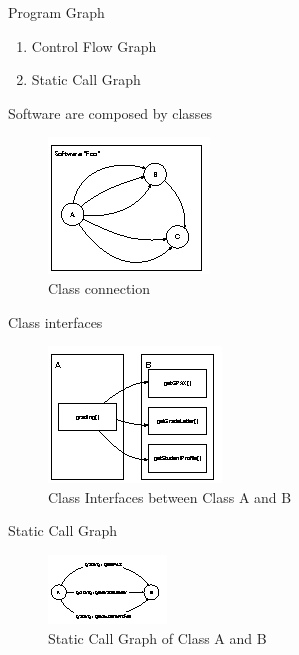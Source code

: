 \documentclass{beamer}
\begin{document}
\begin{frame}{Program Graph}
    \begin{enumerate}
        \item<1-> Control Flow Graph
        \item<2-> Static Call Graph
    \end{enumerate}
\end{frame}

\begin{frame}{Software are composed by classes}
    \begin{figure}
        \includegraphics[width=0.6\paperwidth]{figure/class-connected}
        \caption{Class connection}
        \label{fig:classConnect}
    \end{figure}
\end{frame}

\begin{frame}{Class interfaces}
    \begin{figure}
        \includegraphics[height=0.6\paperheight]{figure/class-interfaces}
        \caption{Class Interfaces between Class A and B}
        \label{fig:classInterfaces}
    \end{figure}
\end{frame}

\begin{frame}{Static Call Graph}
    \begin{figure}
        \includegraphics[width=0.8\paperwidth]{figure/SCG-A-and-B}
        \caption{Static Call Graph of Class A and B}
        \label{fig:staticCallGraphAandB}
    \end{figure}
\end{frame}
\end{document}
